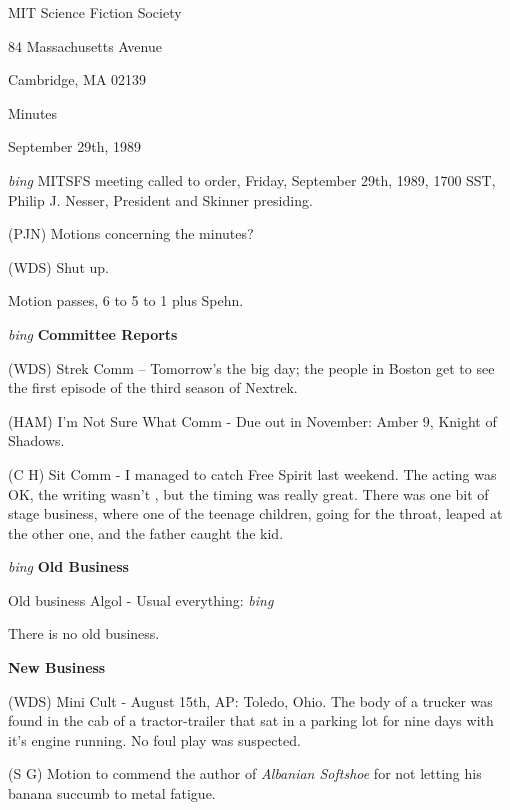 \setlength{\topmargin}{-0.5in}
\setlength{\oddsidemargin}{-0.25in}
\setlength{\textheight}{9in}
\setlength{\textwidth}{6.5in}


\begin{center}
MIT Science Fiction Society

84 Massachusetts Avenue

Cambridge, MA 02139

\vspace{0.2in}
Minutes

September 29th, 1989
\end{center}

\vspace{0.15in} 
{\em bing\/}  MITSFS meeting called to order, Friday, September 29th, 1989,
1700 SST, Philip J. Nesser, President and Skinner presiding.

(PJN) Motions concerning the minutes?

(WDS) Shut up.

Motion passes, 6 to 5 to 1 plus Spehn.

\vspace{0.15in} 
{\em bing\/} {\bf Committee Reports}

(WDS) Strek Comm -- Tomorrow's the big day; the people in Boston get
to see the first episode of the third season of Nextrek.

(HAM) I'm Not Sure What Comm - Due out in November: Amber 9, Knight of
Shadows.

(C H) Sit Comm - I managed to catch Free Spirit last weekend.  The
acting was OK, the writing wasn't   , but the timing was really great.
There was one bit of stage business, where one of the teenage
children, going for the throat, leaped at the other one, and the
father caught the kid.

\vspace{0.15in} 
{\em bing\/}  {\bf Old Business}

Old business Algol - Usual everything: {\em bing\/}

There is no old business.

\vspace{0.15in} 
{\bf New Business}

(WDS) Mini Cult - August 15th, AP: Toledo, Ohio.  The body of a
trucker was found in the cab of a tractor-trailer that sat in a
parking lot for nine days with it's engine running.  No foul play was
suspected.

(S G) Motion to commend the author of {\em Albanian Softshoe} for not
letting his banana succumb to metal fatigue.

